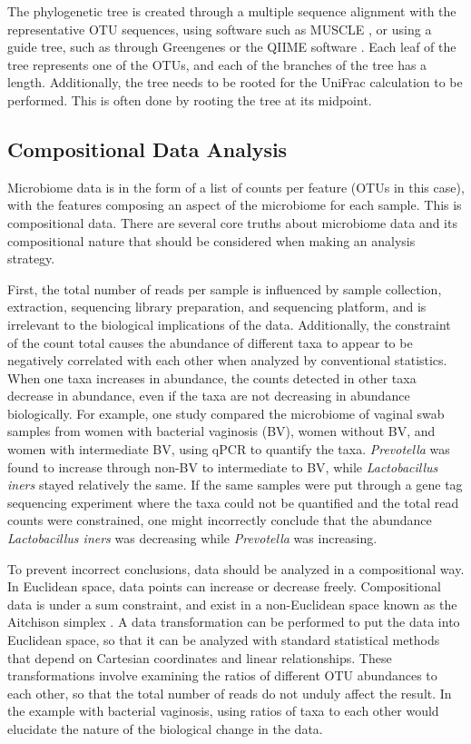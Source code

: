 \documentclass[10pt,letterpaper]{article}
\begin{document}
The phylogenetic tree is created through a multiple sequence alignment with the representative OTU sequences, using software such as MUSCLE \cite{edgar2004muscle}, or using a guide tree, such as through Greengenes \cite{desantis2006greengenes} or the QIIME software \cite{caporaso2010qiime}. Each leaf of the tree represents one of the OTUs, and each of the branches of the tree has a length. Additionally, the tree needs to be rooted for the UniFrac calculation to be performed. This is often done by rooting the tree at its midpoint.

\subsection{Compositional Data Analysis}
Microbiome data is in the form of a list of counts per feature (OTUs in this case), with the features composing an aspect of the microbiome for each sample. This is compositional data. There are several core truths about microbiome data and its compositional nature that should be considered when making an analysis strategy.

First, the total number of reads per sample is influenced by sample collection, extraction, sequencing library preparation, and sequencing platform, and is irrelevant to the biological implications of the data. Additionally, the constraint of the count total causes the abundance of different taxa to appear to be negatively correlated with each other when analyzed by conventional statistics. When one taxa increases in abundance, the counts detected in other taxa decrease in abundance, even if the taxa are not decreasing in abundance biologically. For example, one study compared the microbiome of vaginal swab samples from women with bacterial vaginosis (BV), women without BV, and women with intermediate BV, using qPCR to quantify the taxa. \textit{Prevotella} was found to increase through non-BV to intermediate to BV, while \textit{Lactobacillus iners} stayed relatively the same. If the same samples were put through a gene tag sequencing experiment where the taxa could not be quantified and the total read counts were constrained, one might incorrectly conclude that the abundance \textit{Lactobacillus iners} was decreasing while \textit{Prevotella} was increasing.

To prevent incorrect conclusions, data should be analyzed in a compositional way. In Euclidean space, data points can increase or decrease freely. Compositional data is under a sum constraint, and exist in a non-Euclidean space known as the Aitchison simplex \cite{aitchison1982statistical}. A data transformation can be performed to put the data into Euclidean space, so that it can be analyzed with standard statistical methods that depend on Cartesian coordinates and linear relationships. These transformations involve examining the ratios of different OTU abundances to each other, so that the total number of reads do not unduly affect the result. In the example with bacterial vaginosis, using ratios of taxa to each other would elucidate the nature of the biological change in the data.
\end{document}
